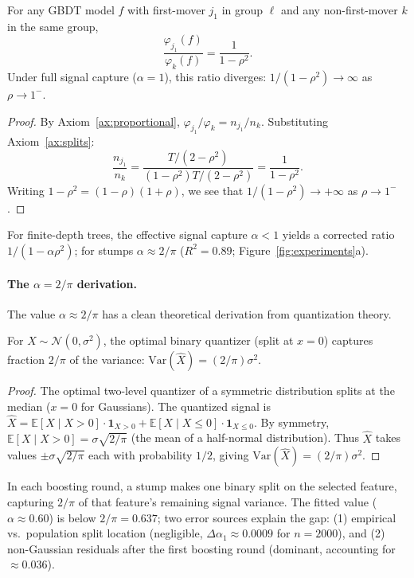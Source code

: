 \documentclass{jmlr}
\newcommand{\E}{\mathbb{E}}
\newcommand{\Var}{\mathrm{Var}}
\newcommand{\GBDT}{\textsc{GBDT}}
\begin{document}
\begin{theorem}
\label{thm:ratio}
For any \GBDT{} model $f$ with first-mover $j_1$ in group $\ell$ and any non-first-mover $k$ in the same group,
\[
    \frac{\varphi_{j_1}(f)}{\varphi_k(f)} = \frac{1}{1 - \rho^2}.
\]
Under full signal capture ($\alpha{=}1$), this ratio diverges: $1/(1-\rho^2) \to \infty$ as $\rho \to 1^-$.
\end{theorem}

\begin{proof}
By Axiom~\ref{ax:proportional}, $\varphi_{j_1}/\varphi_k = n_{j_1}/n_k$.
Substituting Axiom~\ref{ax:splits}:
\[
    \frac{n_{j_1}}{n_k} = \frac{T/(2-\rho^2)}{(1-\rho^2)T/(2-\rho^2)} = \frac{1}{1-\rho^2}.
\]
Writing $1-\rho^2 = (1-\rho)(1+\rho)$, we see that $1/(1-\rho^2) \to +\infty$ as $\rho \to 1^-$.
\end{proof}

For finite-depth trees, the effective signal capture $\alpha < 1$ yields a corrected ratio $1/(1{-}\alpha\rho^2)$; for stumps $\alpha \approx 2/\pi$ ($R^2{=}0.89$; Figure~\ref{fig:experiments}a).

\paragraph{The $\alpha = 2/\pi$ derivation.}
The value $\alpha \approx 2/\pi$ has a clean theoretical derivation from quantization theory.

\begin{proposition}
For $X \sim \mathcal{N}(0, \sigma^2)$, the optimal binary quantizer (split at $x = 0$) captures fraction $2/\pi$ of the variance: $\Var(\hat{X}) = (2/\pi)\sigma^2$.
\end{proposition}

\begin{proof}
The optimal two-level quantizer of a symmetric distribution splits at the median ($x = 0$ for Gaussians). The quantized signal is $\hat{X} = \E[X \mid X > 0] \cdot \mathbf{1}_{X > 0} + \E[X \mid X \leq 0] \cdot \mathbf{1}_{X \leq 0}$. By symmetry, $\E[X \mid X > 0] = \sigma\sqrt{2/\pi}$ (the mean of a half-normal distribution). Thus $\hat{X}$ takes values $\pm\sigma\sqrt{2/\pi}$ each with probability $1/2$, giving $\Var(\hat{X}) = (2/\pi)\sigma^2$.
\end{proof}

In each boosting round, a stump makes one binary split on the selected feature, capturing $2/\pi$ of that feature's remaining signal variance. The fitted value ($\alpha \approx 0.60$) is below $2/\pi = 0.637$; two error sources explain the gap: (1) empirical vs.\ population split location (negligible, $\Delta\alpha_1 \approx 0.0009$ for $n = 2000$), and (2) non-Gaussian residuals after the first boosting round (dominant, accounting for $\approx 0.036$).
\end{document}
